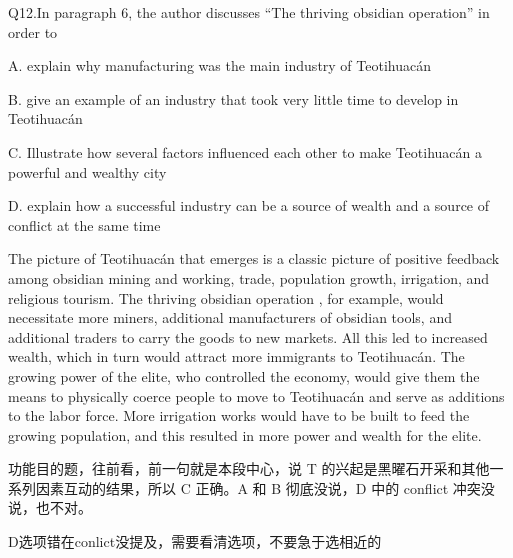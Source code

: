 \begin{blk}
    \begin{qst}
        Q12.In paragraph 6, the author discusses “The thriving obsidian operation” in order to
    \end{qst}

    \begin{chc}
        A. explain why manufacturing was the main industry of Teotihuacán

        B. give an example of an industry that took very little time to develop in Teotihuacán

        C. Illustrate how several factors influenced each other to make Teotihuacán a powerful and wealthy city

        D. explain how a successful industry can be a source of wealth and a source of conflict at the same time
    \end{chc}

    \begin{psgq}
        The picture of Teotihuacán that emerges is a classic picture of positive feedback among obsidian mining and working, trade, population growth, irrigation, and religious tourism. The thriving obsidian operation , for example, would necessitate more miners, additional manufacturers of obsidian tools, and additional traders to carry the goods to new markets. All this led to increased wealth, which in turn would attract more immigrants to Teotihuacán. The growing power of the elite, who controlled the economy, would give them the means to physically coerce people to move to Teotihuacán and serve as additions to the labor force. More irrigation works would have to be built to feed the growing population, and this resulted in more power and wealth for the elite.
    \end{psgq}

    \begin{nlz}
        功能目的题，往前看，前一句就是本段中心，说 T 的兴起是黑曜石开采和其他一系列因素互动的结果，所以 C 正确。A 和 B 彻底没说，D 中的 conflict 冲突没说，也不对。

        D选项错在conlict没提及，需要看清选项，不要急于选相近的
    \end{nlz}
\end{blk}

